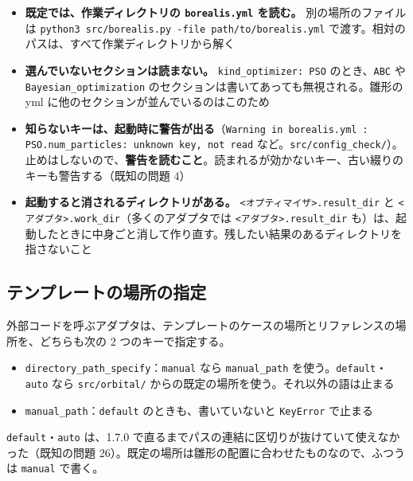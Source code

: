\begin{itemize}
\item \textbf{既定では、作業ディレクトリの \texttt{borealis.\allowbreak{}yml} を読む。} 別の場所のファイルは \texttt{python3 src/\allowbreak{}borealis.\allowbreak{}py -file path/\allowbreak{}to/\allowbreak{}borealis.\allowbreak{}yml} で渡す。相対のパスは、すべて作業ディレクトリから解く
\item \textbf{選んでいないセクションは読まない。} \texttt{kind\_\allowbreak{}optimizer: PSO} のとき、\texttt{ABC} や \texttt{Bayesian\_\allowbreak{}optimization} のセクションは書いてあっても無視される。雛形の yml に他のセクションが並んでいるのはこのため
\item \textbf{知らないキーは、起動時に警告が出る}（\texttt{Warning in borealis.\allowbreak{}yml : PSO.\allowbreak{}num\_\allowbreak{}particles: unknown key,\allowbreak{} not read} など。\texttt{src/\allowbreak{}config\_\allowbreak{}check/\allowbreak{}}）。止めはしないので、\textbf{警告を読むこと}。読まれるが効かないキー、古い綴りのキーも警告する（既知の問題 4）
\item \textbf{起動すると消されるディレクトリがある。} \texttt{<オプティマイザ>.\allowbreak{}result\_\allowbreak{}dir} と \texttt{<アダプタ>.\allowbreak{}work\_\allowbreak{}dir}（多くのアダプタでは \texttt{<アダプタ>.\allowbreak{}result\_\allowbreak{}dir} も）は、起動したときに中身ごと消して作り直す。残したい結果のあるディレクトリを指さないこと
\end{itemize}

\subsection{テンプレートの場所の指定}

外部コードを呼ぶアダプタは、テンプレートのケースの場所とリファレンスの場所を、どちらも次の 2 つのキーで指定する。

\begin{itemize}
\item \texttt{directory\_\allowbreak{}path\_\allowbreak{}specify}：\texttt{manual} なら \texttt{manual\_\allowbreak{}path} を使う。\texttt{default}・\texttt{auto} なら \texttt{src/\allowbreak{}orbital/\allowbreak{}} からの既定の場所を使う。それ以外の語は止まる
\item \texttt{manual\_\allowbreak{}path}：\texttt{default} のときも、書いていないと \texttt{KeyError} で止まる
\end{itemize}

\texttt{default}・\texttt{auto} は、1.7.0 で直るまでパスの連結に区切りが抜けていて使えなかった（既知の問題 26）。既定の場所は雛形の配置に合わせたものなので、ふつうは \texttt{manual} で書く。

